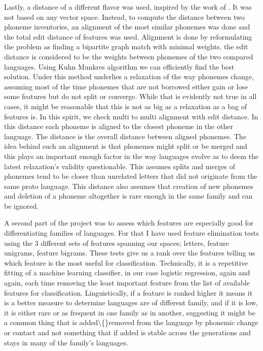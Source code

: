 \documentclass[letterpaper, 11pt]{article}
\begin{document}
Lastly, a distance of a different flavor was used, inspired by the work of . It was not based on any vector space. Instead, to compute the distance between two phoneme inventories, an alignment of the most similar phonemes was done and the total edit distance of features was used. Alignment is done by reformulating the problem as finding a bipartite graph match with minimal weights, the edit distance is considered to be the weights between phonemes of the two compared languages. Using Kuhn Munkres algorithm we can efficiently find the best solution. Under this method underlies a relaxation of the way phonemes change, assuming most of the time phonemes that are not borrowed either gain or lose some features but do not split or converge. While that is evidently not true in all cases, it might be reasonable that this is not as big as a relaxation as a bag of features is.
In this spirit, we check multi to multi alignment with edit distance. In this distance each phoneme is aligned to the closest phoneme in the other language. The distance is the overall distance between aligned phonemes. The idea behind such an alignment is that phonemes might split or be merged and this plays an important enough factor in the way languages evolve as to deem the latest relaxation's validity questionable. This assumes splits and merges of phonemes tend to be closer than unrelated letters that did not originate from the same proto language. This distance also assumes that creation of new phonemes and deletion of a phoneme altogether is rare enough in the same family and can be ignored.

A second part of the project was to assess which features are especially good for differentiating families of languages. For that I have used feature elimination tests using the 3 different sets of features spanning our spaces; letters, feature unigrams, feature bigrams. These tests give us a rank over the features telling us which feature is the most useful for  classification. 
Technically, it is a repetitive fitting of a machine learning classifier, in our case logistic regression, again and again, each time removing the least important feature from the list of available features for classification. 
Linguistically, if a feature is ranked higher it means it is a better measure to determine languages are of different family, and if it is low, it is either rare or as frequent in one family as in another, suggesting it might be a common thing that is added\textbackslash\{\}removed from the language by phonemic change or contact and not something that if added is stable across the generations and stays in many of the family’s languages. 
\end{document}
